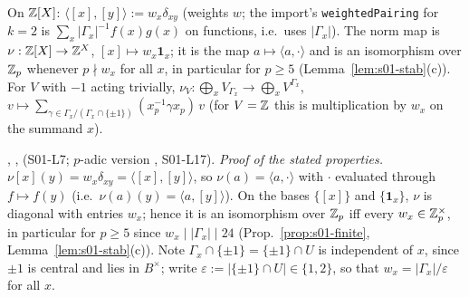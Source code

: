\begin{definition}\label{def:s01-pairing}
On $\mathbb{Z}[X]$: $\langle[x],[y]\rangle:=w_x\delta_{xy}$ (weights $w$; the import's \texttt{weightedPairing} for $k=2$ is
$\sum_x|\Gamma_x|^{-1}f(x)g(x)$ on functions, i.e.\ uses $|\Gamma_x|$). The norm map is
$\nu:\mathbb{Z}[X]\to\mathbb{Z}^X$, $[x]\mapsto w_x\mathbf 1_x$; it is the map $a\mapsto\langle a,\cdot\rangle$ and is an isomorphism over
$\mathbb{Z}_p$ whenever $p\nmid w_x$ for all $x$, in particular for $p\ge5$ (Lemma~\ref{lem:s01-stab}(c)).
For $V$ with $-1$ acting trivially, $\nu_V:\bigoplus_xV_{\Gamma_x}\to\bigoplus_xV^{\Gamma_x}$, $v\mapsto\sum_{\gamma\in\Gamma_x/(\Gamma_x\cap\{\pm1\})}(x_p^{-1}\gamma x_p)\,v$
(for $V=\mathbb{Z}$ this is multiplication by $w_x$ on the summand $x$).
\end{definition}
\noindent \stproved{} , , 
\stformal{} (S01-L7; $p$-adic version , S01-L17).
\emph{Proof of the stated properties.} $\nu[x](y)=w_x\delta_{xy}=\langle[x],[y]\rangle$, so $\nu(a)=\langle a,\cdot\rangle$ with $\cdot$ evaluated
through $f\mapsto f(y)$ (i.e.\ $\nu(a)(y)=\langle a,[y]\rangle$). On the bases $\{[x]\}$ and $\{\mathbf 1_x\}$, $\nu$ is diagonal with entries
$w_x$; hence it is an isomorphism over $\mathbb{Z}_p$ iff every $w_x\in\mathbb{Z}_p^\times$, in particular for $p\ge5$ since $w_x\mid|\Gamma_x|\mid24$
(Prop.~\ref{prop:s01-finite}, Lemma~\ref{lem:s01-stab}(c)). Note $\Gamma_x\cap\{\pm1\}=\{\pm1\}\cap U$ is independent of $x$, since $\pm1$ is central
and lies in $B^\times$; write $\varepsilon:=|\{\pm1\}\cap U|\in\{1,2\}$, so that $w_x=|\Gamma_x|/\varepsilon$ for all $x$.

